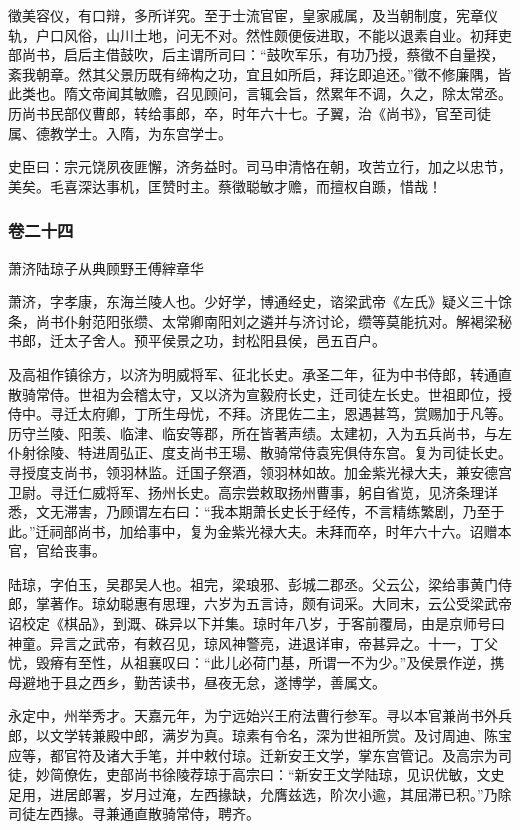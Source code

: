 \documentclass[]{article}
\begin{document}
徵美容仪，有口辩，多所详究。至于士流官宦，皇家戚属，及当朝制度，宪章仪轨，户口风俗，山川土地，问无不对。然性颇便佞进取，不能以退素自业。初拜吏部尚书，启后主借鼓吹，后主谓所司曰：``鼓吹军乐，有功乃授，蔡徵不自量揆，紊我朝章。然其父景历既有缔构之功，宜且如所启，拜讫即追还。''徵不修廉隅，皆此类也。隋文帝闻其敏赡，召见顾问，言辄会旨，然累年不调，久之，除太常丞。历尚书民部仪曹郎，转给事郎，卒，时年六十七。子翼，治《尚书》，官至司徒属、德教学士。入隋，为东宫学士。

史臣曰：宗元饶夙夜匪懈，济务益时。司马申清恪在朝，攻苦立行，加之以忠节，美矣。毛喜深达事机，匡赞时主。蔡徵聪敏才赡，而擅权自踬，惜哉！

\hypertarget{header-n4947}{%
\subsubsection{卷二十四}\label{header-n4947}}

萧济陆琼子从典顾野王傅縡章华

萧济，字孝康，东海兰陵人也。少好学，博通经史，谘梁武帝《左氏》疑义三十馀条，尚书仆射范阳张缵、太常卿南阳刘之遴并与济讨论，缵等莫能抗对。解褐梁秘书郎，迁太子舍人。预平侯景之功，封松阳县侯，邑五百户。

及高祖作镇徐方，以济为明威将军、征北长史。承圣二年，征为中书侍郎，转通直散骑常侍。世祖为会稽太守，又以济为宣毅府长史，迁司徒左长史。世祖即位，授侍中。寻迁太府卿，丁所生母忧，不拜。济毘佐二主，恩遇甚笃，赏赐加于凡等。历守兰陵、阳羡、临津、临安等郡，所在皆著声绩。太建初，入为五兵尚书，与左仆射徐陵、特进周弘正、度支尚书王瑒、散骑常侍袁宪俱侍东宫。复为司徒长史。寻授度支尚书，领羽林监。迁国子祭酒，领羽林如故。加金紫光禄大夫，兼安德宫卫尉。寻迁仁威将军、扬州长史。高宗尝敕取扬州曹事，躬自省览，见济条理详悉，文无滞害，乃顾谓左右曰：``我本期萧长史长于经传，不言精练繁剧，乃至于此。''迁祠部尚书，加给事中，复为金紫光禄大夫。未拜而卒，时年六十六。诏赠本官，官给丧事。

陆琼，字伯玉，吴郡吴人也。祖完，梁琅邪、彭城二郡丞。父云公，梁给事黄门侍郎，掌著作。琼幼聪惠有思理，六岁为五言诗，颇有词采。大同末，云公受梁武帝诏校定《棋品》，到溉、硃异以下并集。琼时年八岁，于客前覆局，由是京师号曰神童。异言之武帝，有敕召见，琼风神警亮，进退详审，帝甚异之。十一，丁父忧，毁瘠有至性，从祖襄叹曰：``此儿必荷门基，所谓一不为少。''及侯景作逆，携母避地于县之西乡，勤苦读书，昼夜无怠，遂博学，善属文。

永定中，州举秀才。天嘉元年，为宁远始兴王府法曹行参军。寻以本官兼尚书外兵郎，以文学转兼殿中郎，满岁为真。琼素有令名，深为世祖所赏。及讨周迪、陈宝应等，都官符及诸大手笔，并中敕付琼。迁新安王文学，掌东宫管记。及高宗为司徒，妙简僚佐，吏部尚书徐陵荐琼于高宗曰：``新安王文学陆琼，见识优敏，文史足用，进居郎署，岁月过淹，左西掾缺，允膺兹选，阶次小逾，其屈滞已积。''乃除司徒左西掾。寻兼通直散骑常侍，聘齐。
\end{document}
